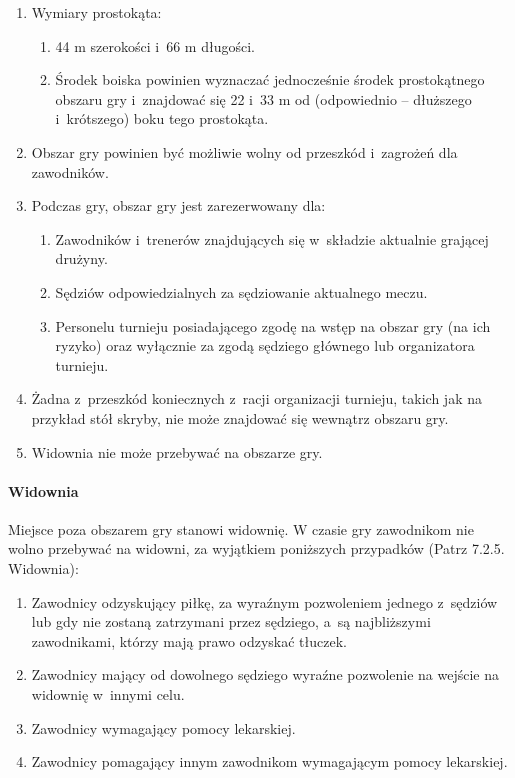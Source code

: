\documentclass[12pt,a4paper]{article}
\begin{document}
\begin{enumerate}
	\item Wymiary prostokąta:
	      \begin{enumerate}
		      \item 44 m szerokości i~66 m długości.
		      \item Środek boiska powinien wyznaczać jednocześnie środek prostokątnego
		            obszaru gry i~znajdować się 22 i~33 m od (odpowiednio -- dłuższego i~krótszego) boku tego prostokąta.
	      \end{enumerate}

	\item Obszar gry powinien być możliwie wolny od przeszkód i~zagrożeń dla
	      zawodników.

	\item Podczas gry, obszar gry jest zarezerwowany dla:
	      \begin{enumerate}
		      \item Zawodników i~trenerów znajdujących się w~składzie aktualnie grającej
		            drużyny.
		      \item Sędziów odpowiedzialnych za sędziowanie aktualnego meczu.
		      \item Personelu turnieju posiadającego zgodę na wstęp na obszar gry (na
		            ich ryzyko) oraz wyłącznie za zgodą sędziego głównego lub
		            organizatora turnieju.
	      \end{enumerate}

	\item Żadna z~przeszkód koniecznych z~racji organizacji turnieju, takich jak
	      na przykład stół skryby, nie może znajdować się wewnątrz obszaru gry.

	\item Widownia nie może przebywać na obszarze gry.
\end{enumerate}

\paragraph{Widownia}
Miejsce poza obszarem gry stanowi widownię.
W czasie gry zawodnikom nie wolno przebywać na widowni, za wyjątkiem
poniższych przypadków (Patrz 7.2.5. Widownia):

\begin{enumerate}
	\item Zawodnicy odzyskujący piłkę, za wyraźnym pozwoleniem jednego z~sędziów lub gdy nie zostaną zatrzymani przez sędziego, a~są najbliższymi zawodnikami, którzy mają prawo odzyskać tłuczek.

	\item Zawodnicy mający od dowolnego sędziego wyraźne pozwolenie na wejście
	      na widownię w~innymi celu.

	\item Zawodnicy wymagający pomocy lekarskiej.

	\item Zawodnicy pomagający innym zawodnikom wymagającym pomocy lekarskiej.
\end{enumerate}
\end{document}
